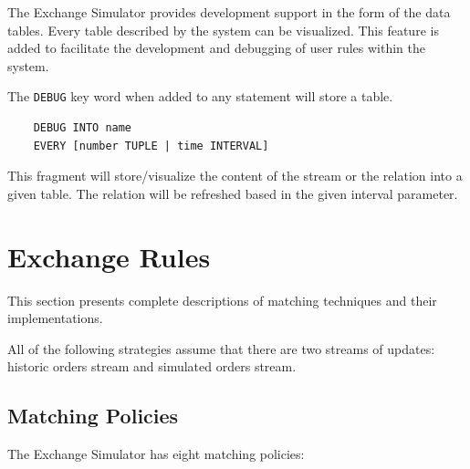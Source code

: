\documentclass{article}
\begin{document}
The Exchange Simulator provides development support in the form of the data tables. Every table described by the system can be visualized. This feature is added to facilitate the development and debugging of user rules within the system. 

The {\tt DEBUG} key word when added to any statement will store a table.

\begin{verbatim}
    DEBUG INTO name
    EVERY [number TUPLE | time INTERVAL] 
\end{verbatim} 

This fragment will store/visualize the content of the stream or the relation into a given table. The relation will be refreshed based in the given interval parameter.

\section{Exchange Rules}

This section presents complete descriptions of matching techniques and their implementations. 

All of the following strategies assume that there are two streams of updates: historic orders stream and simulated orders stream.

\subsection{Matching Policies}

The Exchange Simulator has eight matching policies:
\end{document}
